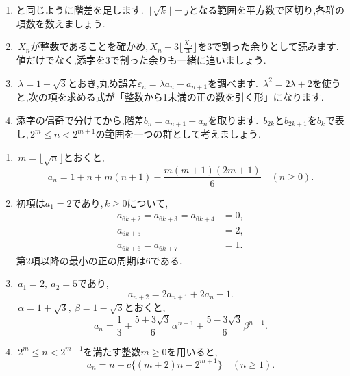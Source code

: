     \noindent {}
    \begin{enumerate}[label=(\arabic*),parsep=3pt,format=\bookitemlink{example-gauss-integer-draft}{hint}{problem}]
      \item {}と同じように階差を足します.
            \,$\lfloor\sqrt{k}\rfloor=j$となる範囲を平方数で区切り,各群の項数を数えましょう.
      \item \,$X_n$が整数であることを確かめ,\,$X_n-3\lfloor\frac{X_n}{3}\rfloor$を3で割った余りとして読みます.
            値だけでなく,添字を3で割った余りも一緒に追いましょう.
      \item \,$\lambda=1+\sqrt3$とおき,丸め誤差$\varepsilon_n=\lambda a_n-a_{n+1}$を調べます.
            \,$\lambda^2=2\lambda+2$を使うと,次の項を求める式が「整数から1未満の正の数を引く形」になります.
      \item 添字の偶奇で分けてから,階差$b_n=a_{n+1}-a_n$を取ります.
            \,$b_{2k}$と$b_{2k+1}$を$b_k$で表し,\,$2^m\le n<2^{m+1}$の範囲を一つの群として考えましょう.
    \end{enumerate}

    \noindent {}
    \begin{enumerate}[label=(\arabic*),parsep=3pt,format=\bookitemlink{example-gauss-integer-draft}{answer}{problem}]
      \item \,$m=\lfloor\sqrt n\rfloor$とおくと,
            \[
              a_n=1+n+m(n+1)
                  -\frac{m(m+1)(2m+1)}6
              \quad(n\ge0).
            \]
      \item 初項は$a_1=2$であり,\,$k\ge0$について,
            \[
              \begin{aligned}
                a_{6k+2}=a_{6k+3}=a_{6k+4}&=0,\\
                a_{6k+5}&=2,\\
                a_{6k+6}=a_{6k+7}&=1.
              \end{aligned}
            \]
            第2項以降の最小の正の周期は6である.
      \item \,$a_1=2,\ a_2=5$であり,
            \[
              a_{n+2}=2a_{n+1}+2a_n-1.
            \]
            \,$\alpha=1+\sqrt3,\ \beta=1-\sqrt3$とおくと,
            \[
              a_n=\frac13
                +\frac{5+3\sqrt3}{6}\alpha^{n-1}
                +\frac{5-3\sqrt3}{6}\beta^{n-1}.
            \]
      \item \,$2^m\le n<2^{m+1}$を満たす整数$m\ge0$を用いると,
            \[
              a_n=n+c\{(m+2)n-2^{m+1}\}
              \quad(n\ge1).
            \]
    \end{enumerate}

